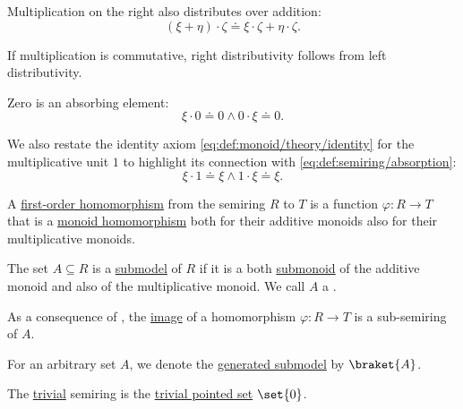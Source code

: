 \begin{definition}
\begin{thmenum}
\begin{thmenum}
       Multiplication on the right also distributes over addition:
      \begin{equation}\label{eq:def:semiring/right_distributivity}
        (\xi + \eta) \cdot \zeta \doteq \xi \cdot \zeta + \eta \cdot \zeta.
      \end{equation}

      If multiplication is commutative, right distributivity follows from left distributivity.

       Zero is an absorbing element:
      \begin{equation}\label{eq:def:semiring/absorption}
        \xi \cdot 0 \doteq 0 \wedge 0 \cdot \xi \doteq 0.
      \end{equation}

       We also restate the identity axiom \eqref{eq:def:monoid/theory/identity} for the multiplicative unit \( 1 \) to highlight its connection with \eqref{eq:def:semiring/absorption}:
      \begin{equation}\label{eq:def:semiring/identity}
        \xi \cdot 1 \doteq \xi \wedge 1 \cdot \xi \doteq \xi.
      \end{equation}
    \end{thmenum}

     A \hyperref[def:first_order_homomorphism]{first-order homomorphism} from the semiring \( R \) to \( T \) is a function \( \varphi: R \to T \) that is a \hyperref[def:monoid/homomorphism]{monoid homomorphism} both for their additive monoids also for their multiplicative monoids.

     The set \( A \subseteq R \) is a \hyperref[thm:substructure_is_model]{submodel} of \( R \) if it is a both \hyperref[def:monoid/submodel]{submonoid} of the additive monoid and also of the multiplicative monoid. We call \( A \) a .

    As a consequence of , the \hyperref[def:multi_valued_function/image]{image} of a homomorphism \( \varphi: R \to T \) is a sub-semiring of \( A \).

    For an arbitrary set \( A \), we denote the \hyperref[def:first_order_generated_substructure]{generated submodel} by \( \braket{ A } \).

     The \hyperref[thm:substructures_form_complete_lattice/bottom]{trivial} semiring is the \hyperref[def:pointed_set/trivial]{trivial pointed set} \( \set{ 0 } \).


\end{thmenum}
\end{definition}
